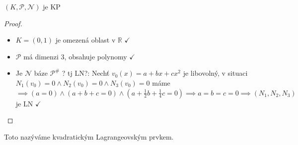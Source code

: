 \documentclass[../main.tex]{subfiles}
\begin{document}
\begin{lemma}
    $(K, \mathcal{P}, \mathcal{N})$ je KP
\end{lemma}
\begin{proof}
    \begin{itemize}
        \item $K = (0,1)$ je omezená oblast v $\mathbb{R}$ $\checkmark$
        \item $\mathcal{P}$ má dimenzi 3, obsahuje polynomy $\checkmark$
        \item Je $\mathcal{N}$ báze $\mathcal{P}^\#$ ? tj LN?: \hfill \break
            Nechť $v_0(x) = a+bx+cx^2$ je libovolný, v situaci $N_1(v_0) = 0 \wedge N_2(v_0) = 0 \wedge N_3(v_0) = 0$ máme \hfill \break
            $\implies (a=0) \wedge (a+b+c = 0) \wedge (a+\frac{1}{2}b + \frac{1}{4}c = 0) \implies a=b=c=0 \implies (N_1, N_2, N_3)$ je LN $\checkmark$
    \end{itemize}        
\end{proof}
\begin{definition}
    Toto nazýváme kvadratickým Lagrangeovským prvkem.
\end{definition}
\end{document}

